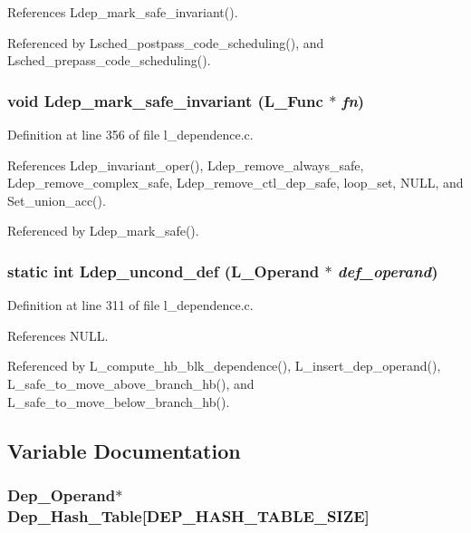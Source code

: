 References Ldep\_\-mark\_\-safe\_\-invariant().

Referenced by Lsched\_\-postpass\_\-code\_\-scheduling(), and Lsched\_\-prepass\_\-code\_\-scheduling().
\subsubsection{\setlength{\rightskip}{0pt plus 5cm}void Ldep\_\-mark\_\-safe\_\-invariant (L\_\-Func $\ast$ {\em fn})}\label{l__dependence_8c_1f244cfa861039836212d125b1a5e399}




Definition at line 356 of file l\_\-dependence.c.

References Ldep\_\-invariant\_\-oper(), Ldep\_\-remove\_\-always\_\-safe, Ldep\_\-remove\_\-complex\_\-safe, Ldep\_\-remove\_\-ctl\_\-dep\_\-safe, loop\_\-set, NULL, and Set\_\-union\_\-acc().

Referenced by Ldep\_\-mark\_\-safe().
\subsubsection{\setlength{\rightskip}{0pt plus 5cm}static int Ldep\_\-uncond\_\-def (L\_\-Operand $\ast$ {\em def\_\-operand})\hspace{0.3cm}{\tt  [static]}}\label{l__dependence_8c_7f64ec615959ab19c308b7c52fa93eec}




Definition at line 311 of file l\_\-dependence.c.

References NULL.

Referenced by L\_\-compute\_\-hb\_\-blk\_\-dependence(), L\_\-insert\_\-dep\_\-operand(), L\_\-safe\_\-to\_\-move\_\-above\_\-branch\_\-hb(), and L\_\-safe\_\-to\_\-move\_\-below\_\-branch\_\-hb().

\subsection{Variable Documentation}
\subsubsection{\setlength{\rightskip}{0pt plus 5cm}\bf{Dep\_\-Operand}$\ast$ \bf{Dep\_\-Hash\_\-Table}[DEP\_\-HASH\_\-TABLE\_\-SIZE]\hspace{0.3cm}{\tt  [static]}}\label{l__dependence_8c_f34f2e696e6f8e641a630ae0dcd4af30}




